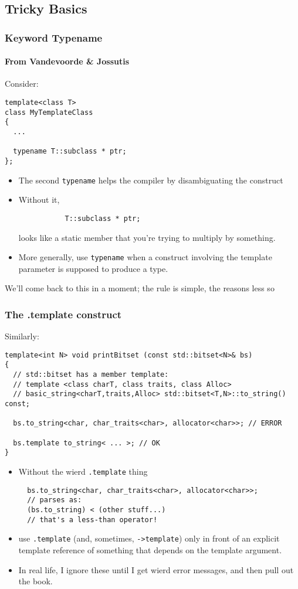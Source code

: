 \subsection[Tricky Basics]{Tricky Basics}

\begin{frame}[fragile,t]
\frametitle{Keyword Typename}
\framesubtitle{From Vandevoorde \& Jossutis}
Consider:

{\scriptsize
\begin{verbatim}
template<class T> 
class MyTemplateClass
{
  ...

  typename T::subclass * ptr;
};
\end{verbatim}
}
\begin{itemize}[<+->]
\item The second \texttt{typename} helps the compiler by
  disambiguating the construct
\item Without it, 
{\scriptsize
\begin{verbatim}
           T::subclass * ptr;
\end{verbatim}
}
looks like a static member that you're trying to multiply by something.
\item More generally, use \texttt{typename} when a construct involving
  the template parameter is supposed to produce a type.
\end{itemize}
\pause
\begin{center}
We'll come back to this in a moment; the rule is simple, the reasons
less so
\end{center}
\end{frame}


\begin{frame}[fragile,t]
\frametitle{The .template construct}
Similarly:
{\scriptsize
\begin{verbatim}
template<int N> void printBitset (const std::bitset<N>& bs)
{
  // std::bitset has a member template:
  // template <class charT, class traits, class Alloc>
  // basic_string<charT,traits,Alloc> std::bitset<T,N>::to_string() const;

  bs.to_string<char, char_traits<char>, allocator<char>>; // ERROR

  bs.template to_string< ... >; // OK
}
\end{verbatim}
}
\begin{itemize}[<+->]
\item Without the wierd \texttt{.template} thing
{\scriptsize
\begin{verbatim}
  bs.to_string<char, char_traits<char>, allocator<char>>;
  // parses as:
  (bs.to_string) < (other stuff...)
  // that's a less-than operator!
\end{verbatim}
}
\item use \texttt{.template} (and, sometimes, \texttt{->template}) only
  in front of an explicit template reference of something that depends
  on the template argument.
\item In real life, I ignore these until I get wierd error messages, and
then pull out the book.

\end{itemize}
\end{frame}

